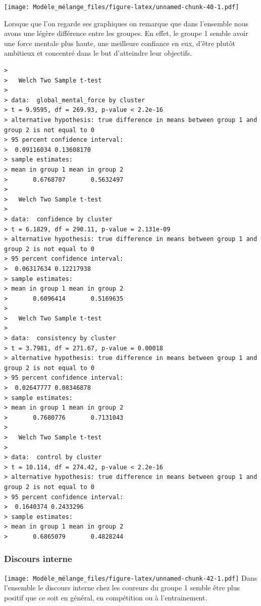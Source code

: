 \documentclass[
]{article}
\begin{document}
\texttt{[image: Modèle\_mélange\_files/figure-latex/unnamed-chunk-40-1.pdf]}

Lorsque que l'on regarde ses graphiques on remarque que dans l'ensemble
nous avons une légère différence entre les groupes. En effet, le groupe
1 semble avoir une force mentale plus haute, une meilleure confiance en
eux, d'être plutôt ambitieux et concentré dans le but d'atteindre leur
objectifs.

\begin{verbatim}
> 
>   Welch Two Sample t-test
> 
> data:  global_mental_force by cluster
> t = 9.9595, df = 269.93, p-value < 2.2e-16
> alternative hypothesis: true difference in means between group 1 and group 2 is not equal to 0
> 95 percent confidence interval:
>  0.09116034 0.13608170
> sample estimates:
> mean in group 1 mean in group 2 
>       0.6768707       0.5632497
> 
>   Welch Two Sample t-test
> 
> data:  confidence by cluster
> t = 6.1829, df = 290.11, p-value = 2.131e-09
> alternative hypothesis: true difference in means between group 1 and group 2 is not equal to 0
> 95 percent confidence interval:
>  0.06317634 0.12217938
> sample estimates:
> mean in group 1 mean in group 2 
>       0.6096414       0.5169635
> 
>   Welch Two Sample t-test
> 
> data:  consistency by cluster
> t = 3.7981, df = 271.67, p-value = 0.00018
> alternative hypothesis: true difference in means between group 1 and group 2 is not equal to 0
> 95 percent confidence interval:
>  0.02647777 0.08346878
> sample estimates:
> mean in group 1 mean in group 2 
>       0.7680776       0.7131043
> 
>   Welch Two Sample t-test
> 
> data:  control by cluster
> t = 10.114, df = 274.42, p-value < 2.2e-16
> alternative hypothesis: true difference in means between group 1 and group 2 is not equal to 0
> 95 percent confidence interval:
>  0.1640374 0.2433296
> sample estimates:
> mean in group 1 mean in group 2 
>       0.6865079       0.4828244
\end{verbatim}

\hypertarget{discours-interne}{%
\subsubsection{Discours interne}\label{discours-interne}}

\texttt{[image: Modèle\_mélange\_files/figure-latex/unnamed-chunk-42-1.pdf]}
Dans l'ensemble le discours interne chez les coureurs du groupe 1 semble
être plus positif que ce soit en général, en compétition ou à
l'entrainement.
\end{document}
